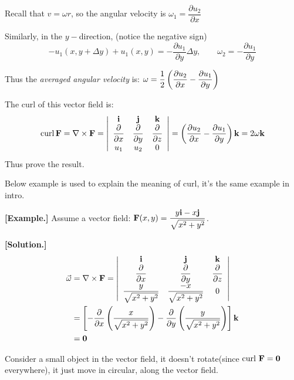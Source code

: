 \documentclass[11pt, a4paper]{MATH2023}
\newcommand{\eg}{\textbf{[Example.] }}
\newcommand{\sol}{\textbf{[Solution.] }}
\newcommand{\ii}{{\bf i}}
\newcommand{\jj}{{\bf j}}
\newcommand{\kk}{{\bf k}}
\newcommand{\FF}{{\bf F}}
\newcommand{\curl}{{\rm curl\ }}
\newcommand{\pt}{\partial}
\begin{document}
\begin{spacing}{1.3}
\begin{center}
    \end{center}
    Recall that $v=\omega r$, so the angular velocity is $\omega_1 = \dfrac{\pt u_2}{\pt x}$

    Similarly, in the $y-$direction, (notice the negative sign)
    $$-u_1(x,y+\Delta y)+u_1(x,y)=-\dfrac{\pt u_1}{\pt y}\Delta y,\qquad 
    \omega_2 = -\dfrac{\pt u_1}{\pt y}$$

    Thus the {\it averaged angular velocity} is: $\disp \omega = \frac{1}{2} 
    \left(\frac{\pt u_2}{\pt x} - \frac{\pt u_1}{\pt y}\right)$

    The curl of this vector field is: 
    $$
    \operatorname{curl} \mathbf{F}=\nabla \times \mathbf{F}=\left|\begin{array}{ccc}
    \mathbf{i} & \mathbf{j} & \mathbf{k} \\
    \dfrac{\partial}{\partial x} & \dfrac{\partial}{\partial y} & \dfrac{\partial}{\partial z} \\
    u_1 & u_2 & 0
    \end{array}\right|= \left(\frac{\pt u_2}{\pt x} - \frac{\pt u_1}{\pt y}\right)\kk =2\omega \kk
    $$
    Thus prove the result.


    \vspace{0.5in}
    {\blue Below example is used to explain the meaning of curl, it's the same example in intro.}

    \eg Assume a vector field: ${\bf F}(x,y)=\dfrac{y\ii -x\jj}{\sqrt{x^2+y^2}}$.

    \sol
    \begin{align*}
        {\vec{\omega}} &= \nabla \times \FF = \left|\begin{array}{ccc}
            \ii & \jj & \kk \\ \dfrac{\partial}{\partial x} & \dfrac{\partial}{\partial y} & \dfrac{\partial}{\partial z} \\
            \dfrac{y}{\sqrt{x^2+y^2}} & \dfrac{-x}{\sqrt{x^2+y^2}} & 0
        \end{array} \right|\\
        &= \left[ -\dfrac{\pt}{\pt x}\left( \dfrac{x}{\sqrt{x^2+y^2}} \right)
                -\dfrac{\pt}{\pt y}\left( \dfrac{y}{\sqrt{x^2+y^2}}\right) \right] \kk \\
        &= {\bf 0}   
    \end{align*}

    Consider a small object in the vector field, it doesn't rotate(since $\curl \FF={\bf 0}$ everywhere),
    it just move in circular, along the vector field.


\end{spacing}
\end{document}
